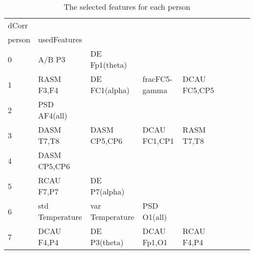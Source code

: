 \clearpage
\begin{landscape}
\begin{table}[]
\centering
\caption{The selected features for each person}
\begin{tabular}{l|llllllll}
dCorr              &                      &                         &                      &                    &                       &                      &                 &                 \\
person             & usedFeatures         &                         &                      &                    &                       &                      &                 &                 \\
0                  & A/B P3               & DE Fp1(theta)           &                      &                    &                       &                      &                 &                 \\
1                  & RASM F3,F4           & DE FC1(alpha)           & fracFC5-gamma        & DCAU FC5,CP5       &                       &                      &                 &                 \\
2                  & PSD AF4(all)         &                         &                      &                    &                       &                      &                 &                 \\
3                  & DASM T7,T8           & DASM CP5,CP6            & DCAU FC1,CP1         & RASM T7,T8         &                       &                      &                 &                 \\
4                  & DASM CP5,CP6         &                         &                      &                    &                       &                      &                 &                 \\
5                  & RCAU F7,P7           & DE P7(alpha)            &                      &                    &                       &                      &                 &                 \\
6                  & std Temperature      & var Temperature         & PSD O1(all)          &                    &                       &                      &                 &                 \\
7                  & DCAU F4,P4           & DE P3(theta)            & DCAU Fp1,O1          & RCAU F4,P4         &                       &                      &                 &                 \\

\end{tabular}
\end{table}
\end{landscape}
